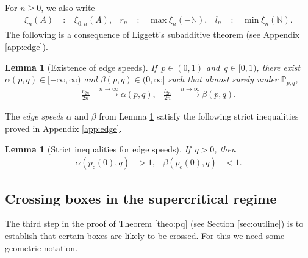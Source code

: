 \documentclass[pdflatex,sn-mathphys-num]{sn-jnl}%
\newcommand{\bbN}{{\ensuremath{\mathbb N}} }
\newcommand{\bbP}{{\ensuremath{\mathbb P}} }
\newcommand{\1}{{\ensuremath{\mathbf{1}}} }
\newcommand{\pc}{\ensuremath{p_{\mathrm{c}} }}
\theoremstyle{thmstyleone}%
\newtheorem{lemma}[theorem]{Lemma}%
\theoremstyle{thmstyletwo}%
\theoremstyle{thmstylethree}%
\begin{document}
For $n\ge 0$, we also write
\begin{align*}
\xi_{n}(A)&{} := \xi_{0,n}(A),&	r_n &{}:= \max \xi_n(-\bbN),&l_n &{}:= \min \xi_n(\bbN).
\end{align*}
The following is a consequence of Liggett's subadditive theorem (see Appendix \ref{app:edge}).
\begin{lemma}[Existence of edge speeds]
\label{lem_alpha_beta}
	If~$p \in (0,1)$ and~$q \in [0,1)$, there exist~$\alpha(p,q) \in [-\infty,\infty)$ and $\beta(p,q) \in (0,\infty]$ such that almost surely under $\bbP_{p,q}$,
	\begin{align*}
		\frac{r_{{2}n}}{{2}n} &\xrightarrow{n \to \infty} \alpha(p,q),&\frac{l_{{2}n}}{{2}n} &\xrightarrow{n \to \infty} \beta(p,q).
	\end{align*}
\end{lemma}
{The \emph{edge speeds} $\alpha$ and $\beta$ from Lemma \ref{lem_alpha_beta} satisfy the following strict inequalities proved in Appendix \ref{app:edge}.}
\begin{lemma}[Strict inequalities for edge speeds]
\label{lem:alpha:strict}
If~$q > 0$, then
\begin{align*}
\alpha(\pc(0),q) &{}> 1,&\beta(\pc(0),q) &{}< 1.
\end{align*}
\end{lemma}






\subsection{Crossing boxes in the supercritical regime}
\label{subsec:crossing}
The third step in the proof of Theorem \ref{theo:pq} (see Section \ref{sec:outline}) is to establish that certain boxes are likely to be crossed. For this we need some geometric notation.
\end{document}

